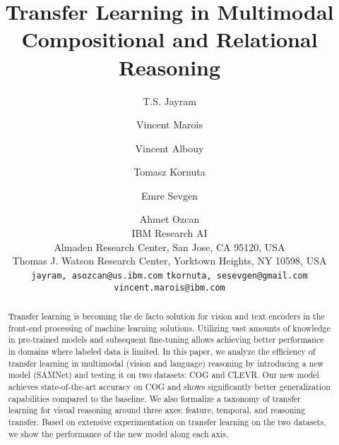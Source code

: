 \documentclass[10pt,twocolumn,letterpaper]{article}
\theoremstyle{remark}
\begin{document}
\title{Transfer Learning in Multimodal Compositional and Relational Reasoning}

\author{T.S. Jayram \and  Vincent Marois \and Vincent Albouy \and Tomasz Kornuta  \and Emre Sevgen \and Ahmet Ozcan\\
IBM Research AI\\
Almaden Research Center, San Jose, CA 95120, USA\\
Thomas J. Watson Research Center, Yorktown Heights, NY 10598, USA\\
{\tt\small {jayram,  asozcan}@us.ibm.com}
{\tt\small {tkornuta, sesevgen}@gmail.com}
{\tt\small vincent.marois@ibm.com}
}

\maketitle

\begin{abstract}
  Transfer learning is becoming the de facto solution for vision and text encoders in the front-end processing of machine learning solutions. Utilizing vast amounts of knowledge in pre-trained models and subsequent fine-tuning allows achieving better performance in domains where labeled data is limited. In this paper, we analyze the efficiency of transfer learning in multimodal (vision and language) reasoning by introducing a new model (SAMNet) and testing it on two datasets: COG and CLEVR.  Our new model achieves state-of-the-art accuracy on COG and shows significantly better generalization capabilities compared to the baseline. We also formalize a taxonomy of transfer learning for visual reasoning around three axes: feature, temporal, and reasoning transfer. Based on extensive experimentation on transfer learning on the two datasets, we show the performance of the new model along each axis.
\end{abstract}













{\small


}

\clearpage

\end{document}
